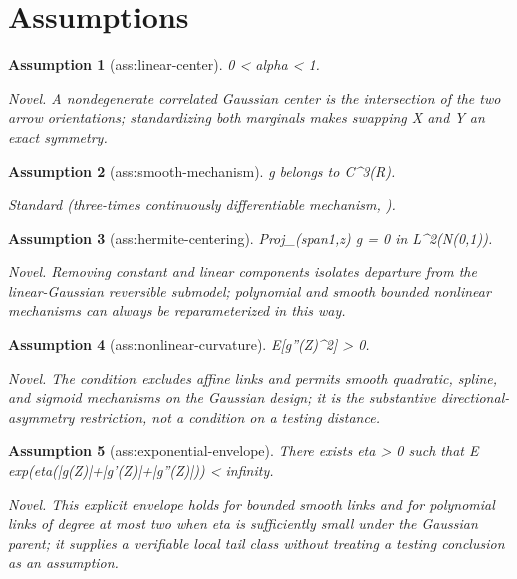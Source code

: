 \documentclass{article}
\newtheorem{assumption}{Assumption}
\begin{document}
\section{Assumptions}

\begin{assumption}[ass:linear-center]\label{ass:linear-center}
0 < alpha < 1.
\par\smallskip\noindent\emph{Novel.} A nondegenerate correlated Gaussian center is the intersection of the two arrow orientations; standardizing both marginals makes swapping X and Y an exact symmetry.
\end{assumption}

\begin{assumption}[ass:smooth-mechanism]\label{ass:smooth-mechanism}
g belongs to C^3(R).
\par\smallskip\noindent\emph{Standard} (three-times continuously differentiable mechanism, \cite{hoyer2008nonlinear}).
\end{assumption}

\begin{assumption}[ass:hermite-centering]\label{ass:hermite-centering}
Proj_(span{1,z}) g = 0 in L^2(N(0,1)).
\par\smallskip\noindent\emph{Novel.} Removing constant and linear components isolates departure from the linear-Gaussian reversible submodel; polynomial and smooth bounded nonlinear mechanisms can always be reparameterized in this way.
\end{assumption}

\begin{assumption}[ass:nonlinear-curvature]\label{ass:nonlinear-curvature}
E[g''(Z)^2] > 0.
\par\smallskip\noindent\emph{Novel.} The condition excludes affine links and permits smooth quadratic, spline, and sigmoid mechanisms on the Gaussian design; it is the substantive directional-asymmetry restriction, not a condition on a testing distance.
\end{assumption}

\begin{assumption}[ass:exponential-envelope]\label{ass:exponential-envelope}
There exists eta > 0 such that E exp(eta(|g(Z)|+|g'(Z)|+|g''(Z)|)) < infinity.
\par\smallskip\noindent\emph{Novel.} This explicit envelope holds for bounded smooth links and for polynomial links of degree at most two when eta is sufficiently small under the Gaussian parent; it supplies a verifiable local tail class without treating a testing conclusion as an assumption.
\end{assumption}
\end{document}
